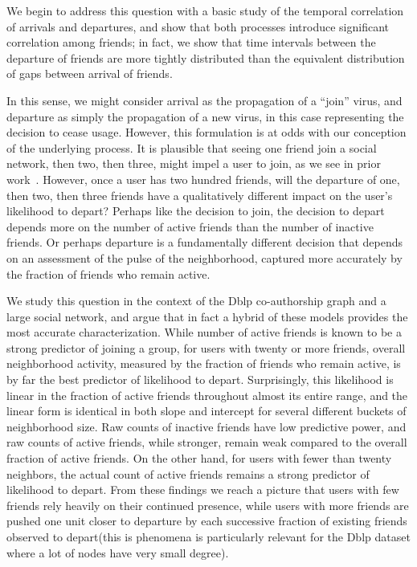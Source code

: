 \documentclass[phd,tocprelim]{cornell}
\begin{document}
We begin to address this question with a basic study of the temporal
correlation of arrivals and departures, and show that both processes
introduce significant correlation among friends; in fact, we show that time intervals between
the departure of friends are more tightly distributed than the
equivalent distribution of gaps between arrival of friends.

In this sense, we might consider arrival as the propagation of a
``join'' virus, and departure as simply the propagation of a new
virus, in this case representing the decision to cease usage.
However, this formulation is at odds with our conception of the
underlying process.  It is plausible that seeing one friend join a
social network, then two, then three, might impel a user to join, as
we see in prior work~\cite{Backstrom:2006}.  However, once a user has two
hundred friends, will the departure of one, then two, then three friends 
have a qualitatively different impact on the user's likelihood to
depart?  Perhaps like the decision to join, the decision to depart
depends more on the number of active friends than the number of
inactive friends.  Or perhaps departure is a fundamentally different
decision that depends on an assessment of the pulse of the
neighborhood, captured more accurately by the fraction of friends who
remain active.

We study this question in the context of the Dblp co-authorship graph and
a large social network, and
argue that in fact a hybrid of these models provides the most accurate
characterization.  While number of active friends is known to be a
strong predictor of joining a group, for users with twenty or more
friends, overall neighborhood activity, measured by the fraction of
friends who remain active, is by far the best predictor of likelihood
to depart.  Surprisingly, this likelihood is linear in the fraction of
active friends throughout almost its entire range, and the linear form
is identical in both slope and intercept for several different buckets
of neighborhood size.  Raw counts of inactive friends have low
predictive power, and raw counts of active friends, while stronger,
remain weak compared to the overall fraction of active friends.  On
the other hand, for users with fewer than twenty neighbors, the actual
count of active friends remains a strong predictor of likelihood to
depart. From these findings we reach a picture that users with few
friends rely heavily on their continued presence, while users with
more friends are pushed one unit closer to departure by each
successive fraction of existing friends observed to depart(this is phenomena
is particularly relevant for the Dblp dataset where a lot of nodes have
very small degree).
\end{document}
